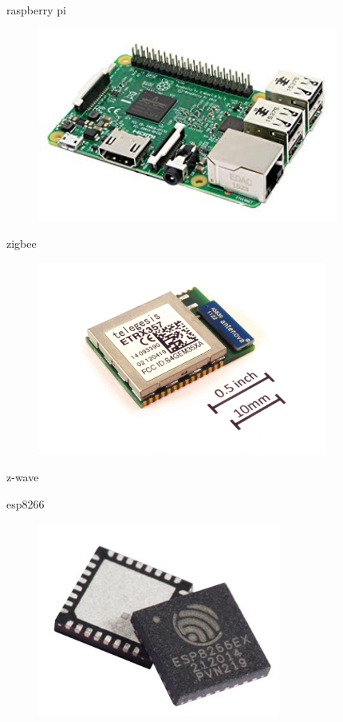 raspberry pi

\begin{figure}[hbt!]
\centering
\includegraphics[height=2.5in]{figures/raspberrypi3b.jpg}
\end{figure}


zigbee
\begin{figure}[hbt!]
\centering
\includegraphics[height=2.5in]{figures/ETRX357_ZigBee_module_with_size_ref.jpg}
\end{figure}

z-wave


esp8266
\begin{figure}[hbt!]
\centering
\includegraphics[height=2.5in]{figures/esp8266ex.jpg}
\end{figure}



